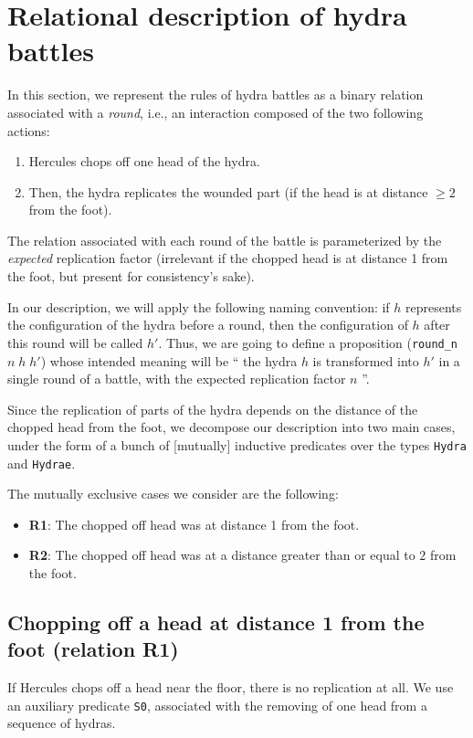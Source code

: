 \section{Relational description of hydra battles}


In this section, we represent the rules of hydra battles as a binary relation associated with
a \emph{round}, i.e., an interaction composed of the two following actions:
\begin{enumerate}
\item Hercules chops off one head of the hydra.
\item Then, the  hydra replicates the wounded part (if the head is at distance $\geq 2$ from the foot).
\end{enumerate}
The relation associated with each round of the battle is parameterized  by the \emph{expected} replication  factor (irrelevant if the chopped head is at distance 1 from the foot,
but present for consistency's sake).

In our description,  we will apply the following naming convention: if $h$ represents the configuration of the hydra before a round, then the configuration of $h$ after this round will be called $h'$.
 Thus, we are going to define a proposition  (\texttt{round\_n $n\;h\;h'$})  whose intended meaning will be `` the hydra $h$  is transformed into $h'$  in a single round of a battle, with the expected replication factor $n$ ''.


Since the replication of parts of the hydra depends on the distance of the chopped head from  the foot, we  decompose our description into two main  cases, under the form of a bunch of [mutually] inductive predicates over the types \texttt{Hydra} and \texttt{Hydrae}.

The mutually exclusive cases we consider are the following:
\begin{itemize}
\item \textbf{R1}: The chopped off head was at distance 1 from the foot.
\item \textbf{R2}: The chopped off head was at a distance greater than or equal to  $2$ from the foot.
\end{itemize}



\subsection{Chopping off a head at distance 1 from the foot (relation  R1)}

If Hercules chops off a head near the floor, there is no replication at all. We use an auxiliary 
predicate \texttt{S0}, associated with the removing of one head from a sequence of hydras.


